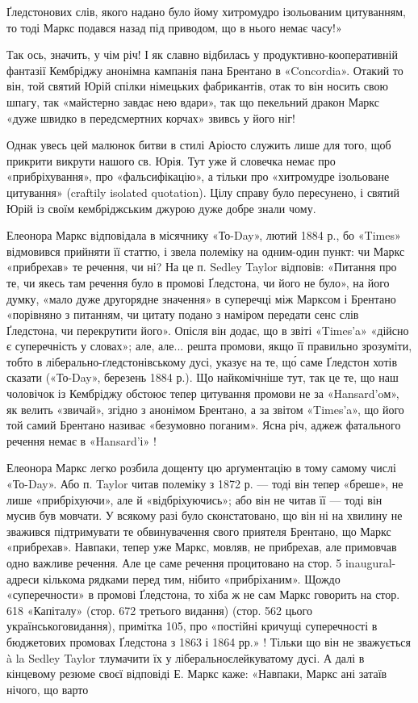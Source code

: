 Ґледстонових слів, якого надано було йому хитромудро ізольованим цитуванням, то тоді Маркс подався
назад під приводом, що в нього немає часу!»

Так ось, значить, у чім річ! І як славно відбилась у продуктивно-кооперативній
фантазії Кембріджу анонімна кампанія пана Брентано в «Concordia». Отакий то він, той святий Юрій
спілки німецьких фабрикантів, отак то він носить свою шпагу, так «майстерно завдає нею вдари», так
що пекельний дракон Маркс «дуже швидко в передсмертних корчах» звивсь у його ніг!

Однак увесь цей малюнок битви в стилі Аріосто служить лише для того, щоб прикрити викрути нашого св.
Юрія. Тут уже й словечка немає про «прибріхування», про «фальсифікацію», а тільки про «хитромудре
ізольоване цитування» (craftily
isolated quotation). Цілу справу було пересунено, і святий Юрій із своїм кембріджським джурою дуже
добре знали чому.

Елеонора Маркс відповідала в місячнику «То-Day», лютий 1884 р., бо «Times» відмовився прийняти її
статтю, і звела полеміку на одним-один пункт: чи Маркс «прибрехав» те речення, чи ні? На це п.
Sedley Taylor відповів: «Питання про те, чи
якесь там речення було в промові Ґледстона, чи його не було», на його думку, «мало дуже другорядне
значення» в суперечці між Марксом і Брентано «порівняно з питанням, чи цитату подано з наміром
передати сенс слів Ґледстона, чи перекрутити
його». Опісля він додає, що в звіті «Times’a» «дійсно є суперечність у словах»; але, але... решта
промови, якщо її правильно зрозуміти, тобто в ліберально-ґледстонівському дусі, указує на те, що́
саме Ґледстон хотів сказати («То-Day», березень 1884 р.). Що найкомічніше тут, так це те, що наш
чоловічок із Кембріджу обстоює тепер цитування промови не за «Hansard’oм», як велить «звичай»,
згідно з анонімом Брентано, а за звітом «Times’a», що його той самий Брентано називає «безумовно
поганим». Ясна річ, аджеж фатального речення немає в «Hansard’і» !

Елеонора Маркс легко розбила дощенту цю арґументацію в тому самому числі «То-Day». Або п. Taylor
читав полеміку з 1872 р. — тоді він тепер «бреше», не лише «прибріхуючи», але й «відбріхуючись»; або
він не читав її — тоді він мусив був
мовчати. У всякому разі було сконстатовано, що він ні на хвилину не зважився підтримувати те
обвинувачення свого приятеля Брентано, що Маркс «прибрехав». Навпаки, тепер уже Маркс, мовляв, не
прибрехав, але примовчав одно важливе речення. Але це саме речення процитовано на стор. 5
inaugural-адреси кількома рядками перед тим, нібито «прибріханим». Щождо «суперечности» в промові
Ґледстона, то хіба ж не сам Маркс говорить на стор. 618 «Капіталу» (стор. 672 третього видання)
(стор. 562 цього українськоговидання), примітка 105, про «постійні кричущі суперечності в бюджетових
промовах Ґледстона з 1863 і 1864 рр.» ! Тільки що
він не зважується à la Sedley Taylor тлумачити їх у ліберальноєлейкуватому
дусі. А далі в кінцевому резюме своєї відповіді Е. Маркс каже: «Навпаки, Маркс ані затаїв нічого, що
варто
